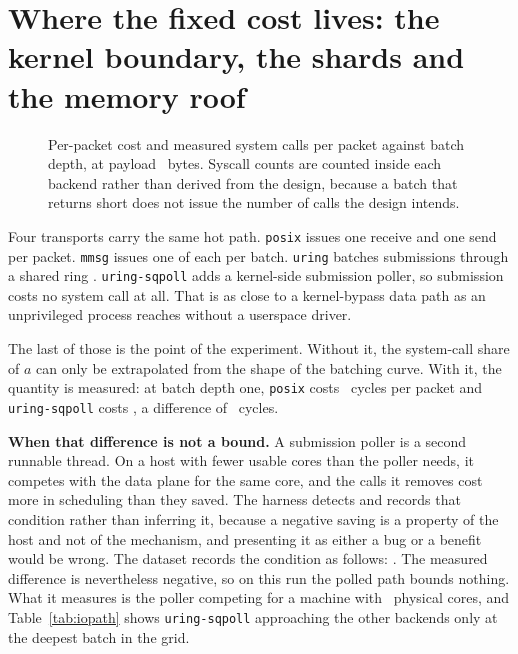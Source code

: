 \section{Where the fixed cost lives: the kernel boundary, the shards
and the memory roof}
\label{sec:iopath}

\begin{figure}[t]
\centering
{}
\caption{Per-packet cost and measured system calls per packet against batch
depth, at payload \protoMaxPayload\ bytes. Syscall counts are counted inside
each backend rather than derived from the design, because a batch that returns
short does not issue the number of calls the design intends.}
\label{fig:iopath}
\end{figure}

Four transports carry the same hot path. \texttt{posix} issues one receive and
one send per packet. \texttt{mmsg} issues one of each per batch.
\texttt{uring} batches submissions through a shared ring \cite{iouring}.
\texttt{uring-sqpoll} adds a kernel-side submission poller, so submission costs
no system call at all. That is as close to a kernel-bypass data path
\cite{netmap,barbette2018} as an unprivileged process reaches without a
userspace driver.

The last of those is the point of the experiment. Without it, the system-call
share of $a$ can only be extrapolated from the shape of the batching curve. With
it, the quantity is measured: at batch depth one, \texttt{posix} costs
\ioPosixCycles\ cycles per packet and \texttt{uring-sqpoll} costs
\ioSqpollCycles, a difference of \ioBoundaryCycles\ cycles.

\noindent\textbf{When that difference is not a bound.}
A submission poller is a second runnable thread. On a host with fewer usable
cores than the poller needs, it competes with the data plane for the same core,
and the calls it removes cost more in scheduling than they saved. The harness
detects and records that condition rather than inferring it, because a negative
saving is a property of the host and not of the mechanism, and presenting it as
either a bug or a benefit would be wrong. The dataset records the condition as
follows: \ioSqpollNote. The measured difference is nevertheless negative, so on
this run the polled path bounds nothing. What it measures is the poller
competing for a machine with \envCores\ physical cores, and
Table~\ref{tab:iopath} shows \texttt{uring-sqpoll} approaching the other
backends only at the deepest batch in the grid.

